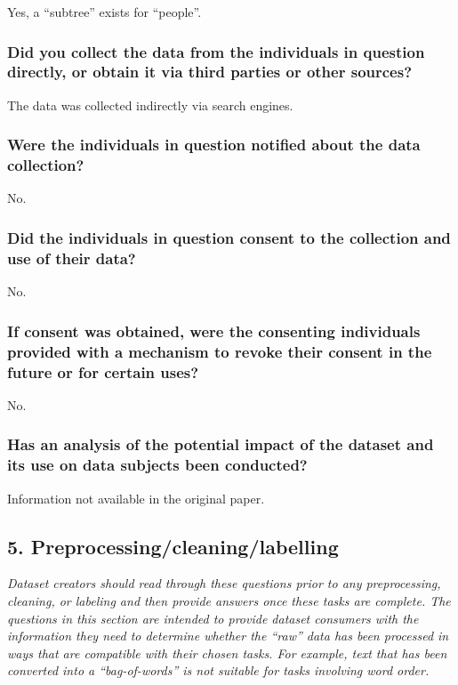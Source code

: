 \documentclass[a4paper,12pt]{article}
\begin{document}
Yes, a “subtree” exists for “people”.

\subsubsection*{Did you collect the data from the individuals in question directly, or obtain it via third parties or
  other sources?}

The data was collected indirectly via search engines.

\subsubsection*{Were the individuals in question notified about the data collection?}

No.

\subsubsection*{Did the individuals in question consent to the collection and use of their data?}
  No.

\subsubsection*{If consent was obtained, were the consenting individuals provided with a mechanism to revoke
  their consent in the future or for certain uses?}

No.

\subsubsection*{Has an analysis of the potential impact of the dataset and its use on data subjects been conducted?}

Information not available in the original paper.


\subsection*{5. Preprocessing/cleaning/labelling}

\textsl{Dataset creators should read
through these questions prior to any preprocessing, cleaning, or labeling and
then provide answers once these tasks are complete. The questions in this
section are intended to provide dataset consumers with the information they
need to determine whether the “raw” data has been processed in ways that are
compatible with their chosen tasks. For example, text that has been converted
into a “bag-of-words” is not suitable for tasks involving word order.}
\end{document}
